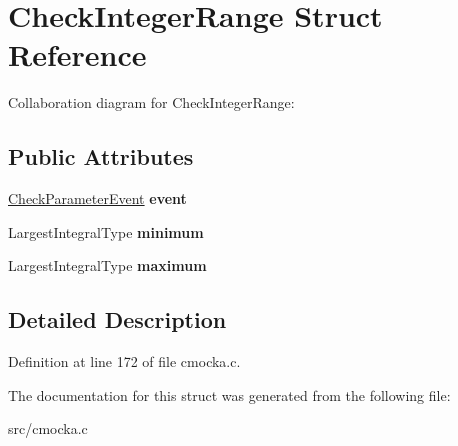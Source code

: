\hypertarget{structCheckIntegerRange}{}\section{Check\+Integer\+Range Struct Reference}
\label{structCheckIntegerRange}


Collaboration diagram for Check\+Integer\+Range\+:
\subsection*{Public Attributes}
\begin{DoxyCompactItemize}
\item 
\mbox{\label{structCheckIntegerRange_a143da2245bf12c28ebc8521e8925d98c}} 
\hyperlink{structCheckParameterEvent}{Check\+Parameter\+Event} {\bfseries event}
\item 
\mbox{\label{structCheckIntegerRange_afcc266d34a957220d9d2a202c67290ff}} 
Largest\+Integral\+Type {\bfseries minimum}
\item 
\mbox{\label{structCheckIntegerRange_a61124c5298a3b1542422125446ef3db1}} 
Largest\+Integral\+Type {\bfseries maximum}
\end{DoxyCompactItemize}


\subsection{Detailed Description}


Definition at line 172 of file cmocka.\+c.



The documentation for this struct was generated from the following file\+:\begin{DoxyCompactItemize}
\item 
src/cmocka.\+c\end{DoxyCompactItemize}
